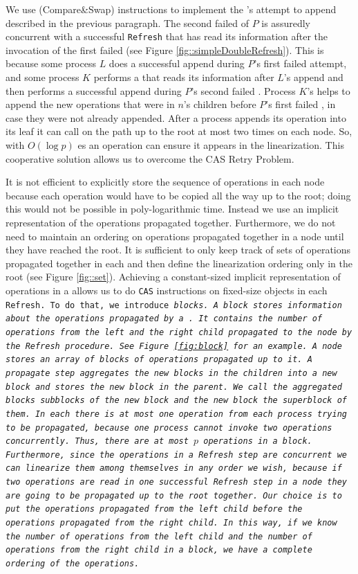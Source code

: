 We use  (Compare\&Swap) instructions to implement the
's attempt to append  described in the previous
paragraph. 
The second failed  of $P$ is assuredly concurrent with a
successful \texttt{Refresh} that has read its information after the
invocation of the first failed  (see Figure
\ref{fig::simpleDoubleRefresh}). This is because some process $L$ does
a successful append during $P$'s first failed attempt, and some
process $K$ performs a  that reads its information after
$L$'s append and then performs a successful append during $P$'s second
failed . Process $K$'s  helps to append the
new operations that were in $n$'s children before $P$'s first failed
, in case they were not already appended. After a process
appends its operation into its leaf it can call  on the
path up to the root at most two times on each node. So, with $O(\log
p)$ es an operation can ensure it appears in the
linearization. This cooperative solution allows us to overcome the CAS
Retry Problem. 


It is not efficient to explicitly store the sequence of operations in
each node because each operation would have to be copied all the way
up to the root; doing this would not be possible in poly-logarithmic
time. 
Instead we use an implicit representation of the operations propagated
together. Furthermore, we do not need to maintain an ordering on
operations propagated together in a node until they have reached the
root. It is sufficient to only keep track of sets of operations
propagated together in each  and then define the
linearization ordering only in the root (see Figure
\ref{fig::set}). Achieving a constant-sized implicit representation of
operations in a  allows us to do \texttt{CAS} instructions
on fixed-size objects in each \tt{Refresh}. To do that, we introduce
\it{block}s. A block stores information about the operations
propagated by a . It contains the number of operations
from the left and the right child propagated to the node by the
\texttt{Refresh} procedure. See Figure~\ref{fig:block} for an
example. A node stores an array of blocks of operations propagated up
to it. A propagate step  aggregates the new blocks in the children
into a new block and stores the new block in the parent. We call the
aggregated blocks \it{subblocks} of the new block and the new block
the \it{superblock} of them.  In each  there is at most
one operation from each process trying to be propagated, because one
process cannot invoke two operations concurrently. Thus, there are at
most $p$ operations in a block. Furthermore, since the operations in a
\texttt{Refresh} step are concurrent we can linearize them  among
themselves in any order we wish, because if two operations are read in
one successful \tt{Refresh} step in a node they are going to be
propagated up to the root together. Our choice is to put the
operations propagated from the left child before the operations
propagated from the right child. In this way, if we know the number of
operations from the left child and the number of operations from the
right child in a block, we have a complete ordering of the
operations. 

